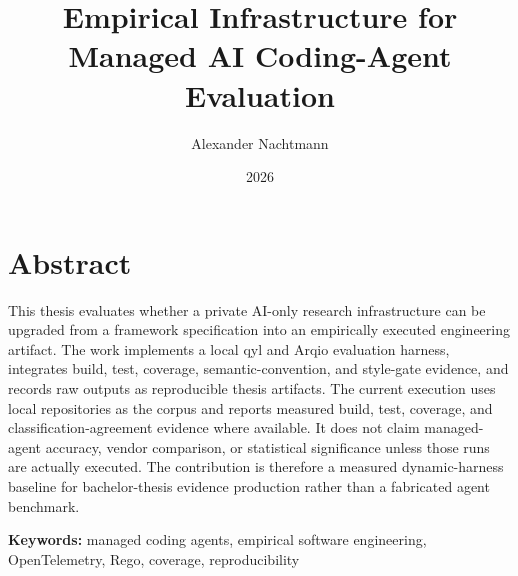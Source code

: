 \documentclass{twbook}
\title{Empirical Infrastructure for Managed AI Coding-Agent Evaluation}
\author{Alexander Nachtmann}
\date{2026}
\begin{document}
\maketitle

\chapter*{Abstract}
This thesis evaluates whether a private AI-only research infrastructure can be upgraded from a framework specification into an empirically executed engineering artifact. The work implements a local qyl and Arqio evaluation harness, integrates build, test, coverage, semantic-convention, and style-gate evidence, and records raw outputs as reproducible thesis artifacts. The current execution uses local repositories as the corpus and reports measured build, test, coverage, and classification-agreement evidence where available. It does not claim managed-agent accuracy, vendor comparison, or statistical significance unless those runs are actually executed. The contribution is therefore a measured dynamic-harness baseline for bachelor-thesis evidence production rather than a fabricated agent benchmark.

\textbf{Keywords:} managed coding agents, empirical software engineering, OpenTelemetry, Rego, coverage, reproducibility







\appendix





\printbibliography
\end{document}
